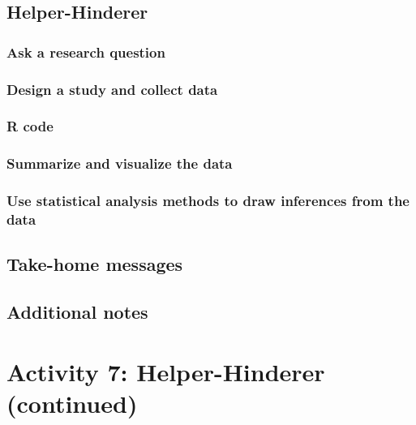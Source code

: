 \documentclass[
]{report}
\begin{document}
\subsection{Helper-Hinderer}\label{helper-hinderer}

\subsubsection*{Ask a research question}\label{ask-a-research-question}

\subsubsection*{Design a study and collect data}\label{design-a-study-and-collect-data}

\subsubsection*{R code}\label{r-code}

\subsubsection*{Summarize and visualize the data}\label{summarize-and-visualize-the-data}

\subsubsection*{Use statistical analysis methods to draw inferences from the data}\label{use-statistical-analysis-methods-to-draw-inferences-from-the-data}

\subsection{Take-home messages}\label{take-home-messages-5}

\subsection{Additional notes}\label{additional-notes-5}

\section{Activity 7: Helper-Hinderer (continued)}\label{activity-7-helper-hinderer-continued}
\end{document}
